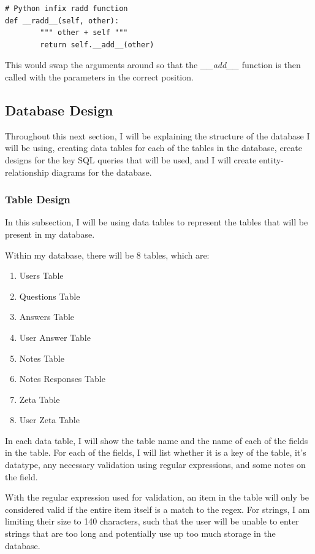 \documentclass{article}
\begin{document}
\begin{lstlisting}
# Python infix radd function
def __radd__(self, other):
        """ other + self """
        return self.__add__(other)
\end{lstlisting}

This would swap the arguments around so that the \textit{\_\_add\_\_} function is then called with the parameters in the correct position.

\clearpage
\subsection{Database Design}

Throughout this next section, I will be explaining the structure of the database I will be using, creating data tables for each of the tables in the database, create designs for the key SQL queries that will be used, and I will create entity-relationship diagrams for the database.

\subsubsection{Table Design}
In this subsection, I will be using data tables to represent the tables that will be present in my database.

Within my database, there will be 8 tables, which are:

\begin{enumerate}
    \item Users Table
    \item Questions Table
    \item Answers Table
    \item User Answer Table
    \item Notes Table
    \item Notes Responses Table
    \item Zeta Table
    \item User Zeta Table
\end{enumerate}

In each data table, I will show the table name and the name of each of the fields in the table. For each of the fields, I will list whether it is a key of the table, it's datatype, any necessary validation using regular expressions, and some notes on the field.

With the regular expression used for validation, an item in the table will only be considered valid if the entire item itself is a match to the regex. For strings, I am limiting their size to 140 characters, such that the user will be unable to enter strings that are too long and potentially use up too much storage in the database.
\end{document}
